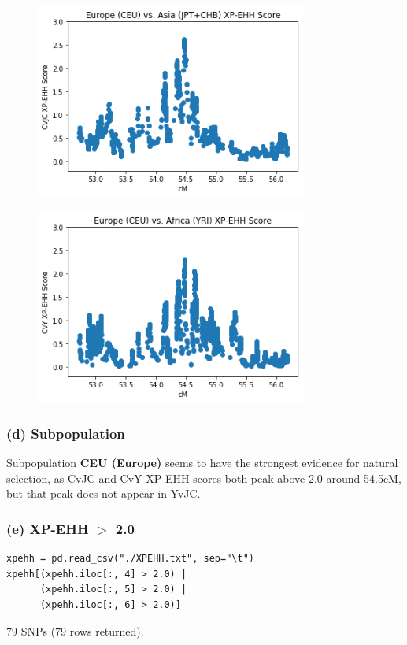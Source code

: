 \documentclass{article}[11pt]
\begin{document}
\begin{figure}[H]
    \includegraphics[width=0.8\textwidth]{problem1/cvjc.png}
\end{figure}

\begin{figure}[H]
    \includegraphics[width=0.8\textwidth]{problem1/cvy.png}
\end{figure}

\subsubsection*{(d) Subpopulation}
Subpopulation {\bf CEU (Europe)} seems to have the
strongest evidence for natural selection, as CvJC
and CvY XP-EHH scores both peak above 2.0 around 54.5cM,
but that peak does not appear in YvJC.

\subsubsection*{(e) XP-EHH $>$ 2.0}
\begin{verbatim}
xpehh = pd.read_csv("./XPEHH.txt", sep="\t")
xpehh[(xpehh.iloc[:, 4] > 2.0) |
      (xpehh.iloc[:, 5] > 2.0) |
      (xpehh.iloc[:, 6] > 2.0)]
\end{verbatim}
79 SNPs (79 rows returned).
\end{document}
